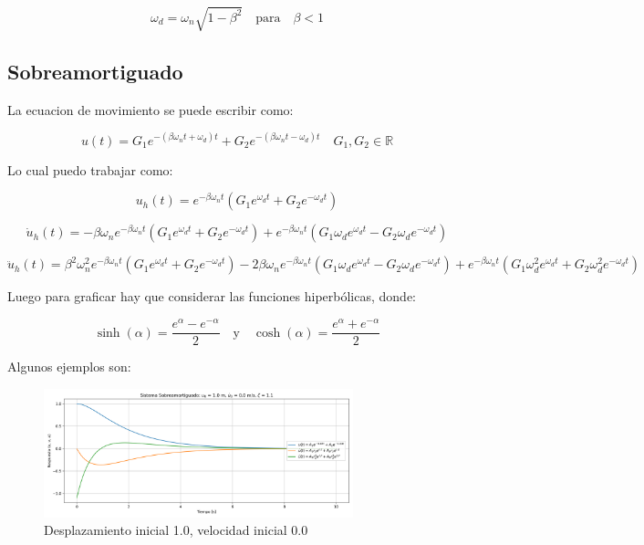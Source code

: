 \documentclass{article}  %
\begin{document}
\begin{equation}
    \omega_d = \omega_n \sqrt{1 - \beta^2} \quad \text{para} \quad \beta < 1
\end{equation}
\subsection{Sobreamortiguado}

La ecuacion de movimiento se puede escribir como:

\begin{equation}
    u(t) = G_1 e^{-(\beta \omega_n t + \omega_d)t} + G_2 e^{-(\beta \omega_n t - \omega_d)t} \quad G_1, G_2 \in \mathbb{R}
\end{equation}

Lo cual puedo trabajar como:

\begin{equation}
    u_h(t) = e^{-\beta \omega_n t} (G_1 e^{\omega_d t} + G_2 e^{-\omega_d t}) 
\end{equation}

\begin{equation}
    \dot{u}_h(t) = -\beta \omega_n e^{-\beta \omega_n t} (G_1 e^{\omega_d t} + G_2 e^{-\omega_d t}) + e^{-\beta \omega_n t} (G_1 \omega_d e^{\omega_d t} - G_2 \omega_d e^{-\omega_d t})
\end{equation}

\begin{equation}
    \ddot{u}_h(t) = \beta^2 \omega_n^2 e^{-\beta \omega_n t} (G_1 e^{\omega_d t} + G_2 e^{-\omega_d t}) - 2\beta \omega_n e^{-\beta \omega_n t} (G_1 \omega_d e^{\omega_d t} - G_2 \omega_d e^{-\omega_d t}) + e^{-\beta \omega_n t} (G_1 \omega_d^2 e^{\omega_d t} + G_2 \omega_d^2 e^{-\omega_d t})
\end{equation}

Luego para graficar hay que considerar las funciones hiperbólicas, donde:

\begin{equation}
    \sinh(\alpha) = \frac{e^{\alpha} - e^{-\alpha}}{2} \quad \text{y} \quad \cosh(\alpha) = \frac{e^{\alpha} + e^{-\alpha}}{2}
\end{equation}

Algunos ejemplos son:

\begin{figure}[H]
    \centering
    \includegraphics[width=0.8\textwidth]{GRAFICOS/sis_sobreamortiguado_u0_1.0_v0_0.0_zeta_1.1.png}
    \caption{Desplazamiento inicial 1.0, velocidad inicial 0.0}
    \label{fig:ejemplo1}
\end{figure}
\end{document}
